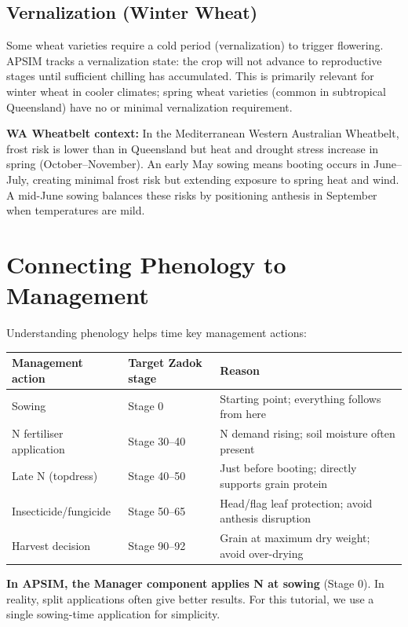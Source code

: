 \subsection{Vernalization (Winter Wheat)}

Some wheat varieties require a cold period (vernalization) to trigger flowering. APSIM tracks a vernalization state: the crop will not advance to reproductive stages until sufficient chilling has accumulated. This is primarily relevant for winter wheat in cooler climates; spring wheat varieties (common in subtropical Queensland) have no or minimal vernalization requirement.

\begin{tipbox}
\textbf{WA Wheatbelt context:} In the Mediterranean Western Australian Wheatbelt, frost risk is lower than in Queensland but heat and drought stress increase in spring (October--November). An early May sowing means booting occurs in June--July, creating minimal frost risk but extending exposure to spring heat and wind. A mid-June sowing balances these risks by positioning anthesis in September when temperatures are mild.
\end{tipbox}

\section{Connecting Phenology to Management}

Understanding phenology helps time key management actions:

\begin{center}
\begin{tabular}{l|l|l}
\textbf{Management action} & \textbf{Target Zadok stage} & \textbf{Reason} \\
\hline
Sowing & Stage 0 & Starting point; everything follows from here \\
N fertiliser application & Stage 30--40 & N demand rising; soil moisture often present \\
Late N (topdress) & Stage 40--50 & Just before booting; directly supports grain protein \\
Insecticide/fungicide & Stage 50--65 & Head/flag leaf protection; avoid anthesis disruption \\
Harvest decision & Stage 90--92 & Grain at maximum dry weight; avoid over-drying \\
\end{tabular}
\end{center}

\begin{warningbox}
\textbf{In APSIM, the Manager component applies N at sowing} (Stage 0). In reality, split applications often give better results. For this tutorial, we use a single sowing-time application for simplicity.
\end{warningbox}

